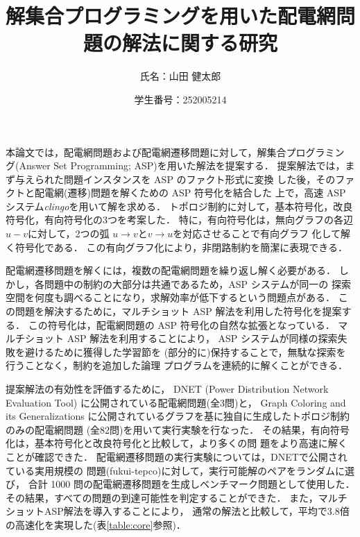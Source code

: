 \documentclass[dvipdfmx,a4paper]{jsarticle}
\title{\vspace{-3cm}解集合プログラミングを用いた配電網問題の解法に関する研究}
\author{氏名：山田 健太郎}
\date{学生番号：252005214}
\begin{document}
\maketitle


本論文では，配電網問題および配電網遷移問題に対して，解集合プログラミン
グ(Answer Set Programming; ASP)を用いた解法を提案する．
提案解法では，まず与えられた問題インスタンスを ASP のファクト形式に変換
した後，そのファクトと配電網(遷移)問題を解くための ASP 符号化を結合した
上で，高速 ASP システム\textit{clingo}を用いて解を求める．
トポロジ制約に対して，基本符号化，改良符号化，有向符号化の3つを考案した．
特に，有向符号化は，無向グラフの各辺$u-v$に対して，2つの弧
$u\rightarrow v$と$v\rightarrow u$を対応させることで有向グラフ
化して解く符号化である．
この有向グラフ化により，非閉路制約を簡潔に表現できる．

配電網遷移問題を解くには，複数の配電網問題を繰り返し解く必要がある．
しかし，各問題中の制約の大部分は共通であるため，ASP システムが同一の
探索空間を何度も調べることになり，求解効率が低下するという問題点がある．
この問題を解決するために，マルチショット ASP 解法を利用した符号化を提案する．
この符号化は，配電網問題の ASP 符号化の自然な拡張となっている．
マルチショット ASP 解法を利用することにより，
ASP システムが同様の探索失敗を避けるために獲得した学習節を
(部分的に)保持することで，無駄な探索を行うことなく，制約を追加した論理
プログラムを連続的に解くことができる．

提案解法の有効性を評価するために，
DNET (Power Distribution Network Evaluation Tool)
に公開されている配電網問題(全3問)と，
Graph Coloring and its Generalizations
に公開されているグラフを基に独自に生成したトポロジ制約のみの配電網問題
(全82問)を用いて実行実験を行なった．
その結果，有向符号化は，基本符号化と改良符号化と比較して，より多くの問
題をより高速に解くことが確認できた．
%
配電網遷移問題の実行実験については，DNETで公開されている実用規模の
問題({\sf fukui-tepco})に対して，実行可能解のペアをランダムに選び，
合計 1000 問の配電網遷移問題を生成しベンチマーク問題として使用した．
その結果，すべての問題の到達可能性を判定することができた．
また，マルチショットASP解法を導入することにより，
通常の解法と比較して，平均で3.8倍の高速化を実現した(表\ref{table:core}参照)．
\end{document}
